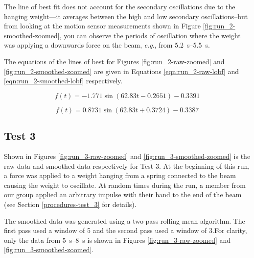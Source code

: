 \documentclass[12 pt]{report}
\newcommand{\eg}{\textit{e}.\textit{g}., }
\begin{document}
The line of best fit does not account for the secondary oscillations due to the hanging weight---it averages between the high and low secondary oscillations--but from looking at the motion sensor measurements shown in Figure \ref{fig:run_2-smoothed-zoomed}, you can observe the periods of oscillation where the weight was applying a downwards force on the beam, \eg from \qtyrange{5.2}{5.5}{\s}.

The equations of the lines of best for Figures \ref{fig:run_2-raw-zoomed} and \ref{fig:run_2-smoothed-zoomed} are given in Equations \ref{eqn:run_2-raw-lobf} and \ref{eqn:run_2-smoothed-lobf} respectively.

\begin{equation} \label{eqn:run_2-raw-lobf}
f(t)=-1.771\sin(62.83t-0.2651)-0.3391
\end{equation}

\begin{equation} \label{eqn:run_2-smoothed-lobf}
f(t)=0.8731\sin(62.83t+0.3724)-0.3387
\end{equation}

\subsection{Test 3} \label{data-test_3}
Shown in Figures \ref{fig:run_3-raw-zoomed} and \ref{fig:run_3-smoothed-zoomed} is the raw data and smoothed data respectively for Test \num{3}. At the beginning of this run, a force was applied to a weight hanging from a spring connected to the beam causing the weight to oscillate. At random times during the run, a member from our group applied an arbitrary impulse with their hand to the end of the beam (see Section \ref{procedures-test_3} for details).

The smoothed data was generated using a two-pass rolling mean algorithm. The first pass used a window of \num{5} and the second pass used a window of \num{3}.For clarity, only the data from \qtyrange{5}{8}{\s} is shown in Figures \ref{fig:run_3-raw-zoomed} and \ref{fig:run_3-smoothed-zoomed}.
\end{document}
